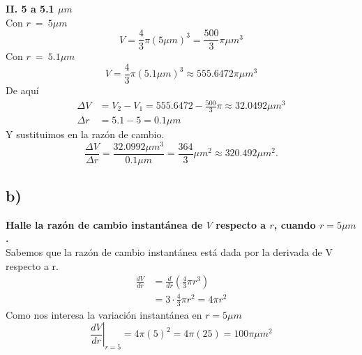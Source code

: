 \documentclass[11pt,letterpaper]{article}
\begin{document}
\textbf{II. 5 a 5.1 $\mu m$}\\
Con $r \ = \ 5\mu m$
\begin{equation*}
  V=\frac{4}{3}\pi (5\mu m)^3=\frac{500}{3}\pi\mu m ^3
\end{equation*}
Con $r \ = \ 5.1 \mu m $
\begin{equation*}
  V=\frac{4}{3}\pi (5.1\mu m)^3 \approx 555.6472\pi\mu m ^3
\end{equation*}
De aquí
\begin{equation*}
  \begin{split}
    \Delta V &= V_2-V_1=555.6472-\frac{500}{3}\pi\approx 32.0492 \mu m^3 \\
    \Delta r &= 5.1-5 = 0.1 \mu m
  \end{split}
\end{equation*}
Y sustituimos en la razón de cambio.
\begin{equation*}
  \frac{\Delta V}{\Delta r}=\frac{32.0992 \mu m^3}{0.1 \mu m}=\frac{364}{3}\mu m^2\approx 320.492 \mu m^2.
\end{equation*}

\subsection*{b)}
\textbf{Halle la razón de cambio instantánea de $V$ respecto a $r$, cuando $r=5\mu m$.}\\
Sabemos que la razón de cambio instantánea está dada por la derivada de V respecto a r.
\begin{equation*}
  \begin{split}
    \frac{dV}{dr}&=\frac{d}{dr}\left(\frac{4}{3}\pi r^3\right) \\
    &= 3\cdot\frac{4}{3}\pi r^2 = 4\pi r^2
  \end{split}
\end{equation*}
Como nos interesa la variación instantánea en $r=5\mu m$
\begin{equation*}
  \left.\frac{dV}{dr}\right|_{r=5}=4\pi(5)^2=4\pi(25)=100\pi\mu m^2
\end{equation*}
\end{document}
